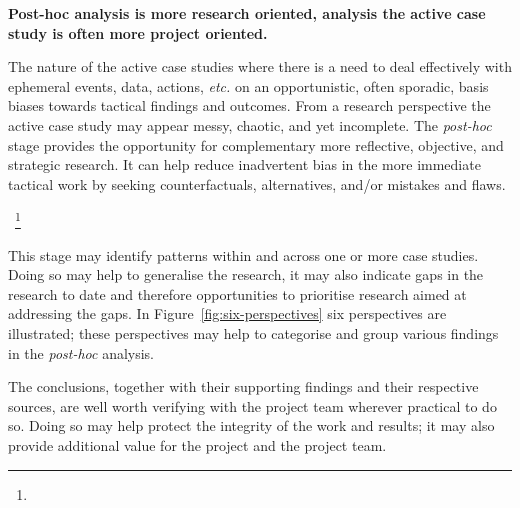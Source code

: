 \textbf{Post-hoc analysis is more research oriented, analysis the active case study is often more project oriented.} 

The nature of the active case studies where there is a need to deal effectively with ephemeral events, data, actions, \textit{etc.} on an opportunistic, often sporadic, basis biases towards tactical findings and outcomes. From a research perspective the active case study may appear messy, chaotic, and yet incomplete. 
The \textit{post-hoc} stage provides the opportunity for complementary more reflective, objective, and strategic research. It can help reduce inadvertent bias in the more immediate tactical work by seeking counterfactuals, alternatives, and/or mistakes and flaws.

~\footnote{}

This stage may identify patterns within and across one or more case studies. Doing so may help to generalise the research, it may also indicate gaps in the research to date and therefore opportunities to prioritise research aimed at addressing the gaps.
In Figure~\ref{fig:six-perspectives} six perspectives are illustrated; these perspectives may help to categorise and group various findings in the \textit{post-hoc} analysis. 

The conclusions, together with their supporting findings and their respective sources, are well worth verifying with the project team wherever practical to do so. Doing so may help protect the integrity of the work and results; it may also provide additional value for the project and the project team. 


